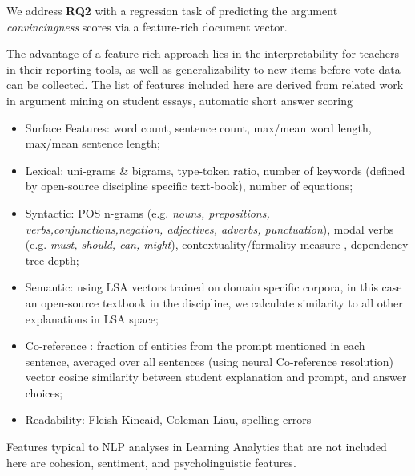\documentclass[notitlepage,12pt]{jedm}
\begin{document}
We address \textbf{RQ2} with a regression task of predicting the argument 
\textit{convincingness} scores via a feature-rich document vector.


The advantage of a feature-rich approach lies in the interpretability for 
teachers in their reporting tools, as well as generalizability to new items 
before vote data can be collected.
The list of features included here are derived from related work in argument 
mining \cite{habernal_which_2016}\cite{persing_end--end_2016}on student essays, 
automatic short answer scoring \cite{mohler_text--text_2009}

\begin{itemize}
	
	\item Surface Features: 
	word count,
	sentence count, 
	max/mean word length, 
	max/mean sentence length;
	
	\item Lexical: 
	uni-grams \& bigrams, 
	type-token ratio, 
	number of keywords (defined by open-source discipline specific 
	text-book), 
	number of equations;
	
	\item Syntactic: 
	POS n-grams (e.g. \textit{nouns, prepositions, 
		verbs,conjunctions,negation, adjectives, adverbs, punctuation}), 
	modal verbs (e.g. \textit{must, should, can, might}),
	contextuality/formality measure \cite{heylighen_variation_2002},
	dependency tree depth;
	
	\item Semantic:
	using LSA vectors trained on domain specific corpora, in this case an 
	open-source textbook in the discipline, we calculate similarity to all 
	other explanations in LSA space;
	
	\item Co-reference \cite{persing_end--end_2016}: 
	fraction of entities from the prompt mentioned in each sentence, 
	averaged over all sentences (using neural Co-reference resolution)
	vector cosine similarity between student explanation and prompt, 
	and answer choices; 
	
	\item Readability:
	Fleish-Kincaid,
	Coleman-Liau,
	spelling errors
\end{itemize}


Features typical to NLP analyses in Learning Analytics that are not included 
here are cohesion, sentiment, and psycholinguistic features.





\end{document}
